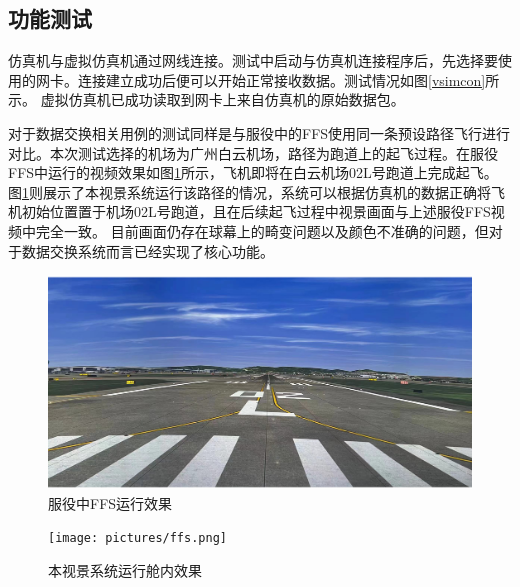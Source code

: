 \subsection{功能测试}
仿真机与虚拟仿真机通过网线连接。测试中启动与仿真机连接程序后，先选择要使用的网卡。连接建立成功后便可以开始正常接收数据。测试情况如图\ref{vsimcon}所示。
虚拟仿真机已成功读取到网卡上来自仿真机的原始数据包。
\par
对于数据交换相关用例的测试同样是与服役中的FFS使用同一条预设路径飞行进行对比。本次测试选择的机场为广州白云机场，路径为跑道上的起飞过程。在服役FFS中运行的视频效果如图\ref{flightffs}所示，飞机即将在白云机场02L号跑道上完成起飞。
图\ref{flightffs}则展示了本视景系统运行该路径的情况，系统可以根据仿真机的数据正确将飞机初始位置置于机场02L号跑道，且在后续起飞过程中视景画面与上述服役FFS视频中完全一致。
目前画面仍存在球幕上的畸变问题以及颜色不准确的问题，但对于数据交换系统而言已经实现了核心功能。
\begin{figure}[h!]
    \begin{center}
        \includegraphics[width=.8\textwidth]{pictures/ffs2.png}
        \caption{服役中FFS运行效果}
        \label{flightffs}
    \end{center}
\end{figure}
\begin{figure}[h!]
    \begin{center}
        \texttt{[image: pictures/ffs.png]}
        \caption{本视景系统运行舱内效果}
        \label{flighttest}
    \end{center}
\end{figure}
